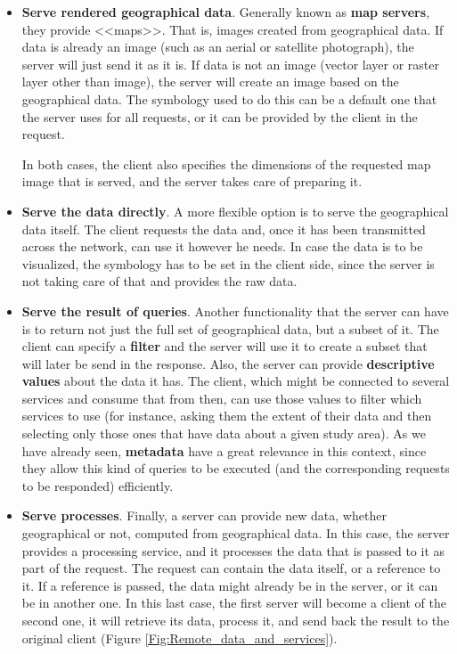 \begin{itemize}
\item \textbf{Serve rendered geographical data}. Generally known as \textbf{map servers}, they provide <<maps>>. That is, images created from geographical data. If data is already an image (such as an aerial or satellite photograph), the server will just send it as it is. If data is not an image (vector layer or raster layer other than image), the server will create an image based on the geographical data. The symbology used to do this can be a default one that the server uses for all requests, or it can be provided by the client in the request. 

In both cases, the client also specifies the dimensions of the requested map image that is served, and the server takes care of preparing it.


\item \textbf{Serve the data directly}. A more flexible option is to serve the geographical data itself. The client requests the data and, once it has been transmitted across the network, can use it however he needs. In case the data is to be visualized, the symbology has to be set in the client side, since the server is not taking care of that and provides the raw data.


\item \textbf{Serve the result of queries}. Another functionality that the server can have is to return not just the full set of geographical data, but a subset of it. The client can specify a \textbf{filter} and the server will use it to create a subset that will later be send in the response. Also, the server can provide \textbf{descriptive values} about the data it has. The client, which might be connected to several services and consume that from then, can use those values to filter which services to use (for instance, asking them the extent of their data and then selecting only those ones that have data about a given study area). As we have already seen, \textbf{metadata} have a great relevance in this context, since they allow this kind of queries to be executed (and the corresponding requests to be responded) efficiently.

\item \textbf{Serve processes}. Finally, a server can provide new data, whether geographical or not, computed from geographical data. In this case, the server provides a processing service, and it processes the data that is passed to it as part of the request. The request can contain the data itself, or a reference to it. If a reference is passed, the data might already be in the server, or it can be in another one. In this last case, the first server will become a client of the second one, it will retrieve its data, process it, and send back the result to the original client (Figure \ref{Fig:Remote_data_and_services}).



\end{itemize}
